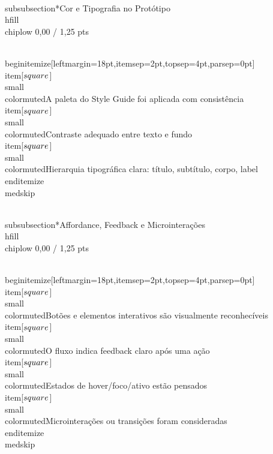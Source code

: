 \documentclass[11pt, a4paper]{article}
\newcommand{\chiplow}[1]{\colorbox{crimsondim}{\color{crimson}\semibold\small\strut\ #1\ }}
\begin{document}
\\subsubsection*{Cor e Tipografia no Protótipo \\hfill {\\chiplow 0,00 / 1,25 pts}}

\\begin{itemize}[leftmargin=18pt,itemsep=2pt,topsep=4pt,parsep=0pt]
  \\item[$\\square$] {\\small\\color{muted}A paleta do Style Guide foi aplicada com consistência}
  \\item[$\\square$] {\\small\\color{muted}Contraste adequado entre texto e fundo}
  \\item[$\\square$] {\\small\\color{muted}Hierarquia tipográfica clara: título, subtítulo, corpo, label}
\\end{itemize}
\\medskip

\\subsubsection*{Affordance, Feedback e Microinterações \\hfill {\\chiplow 0,00 / 1,25 pts}}

\\begin{itemize}[leftmargin=18pt,itemsep=2pt,topsep=4pt,parsep=0pt]
  \\item[$\\square$] {\\small\\color{muted}Botões e elementos interativos são visualmente reconhecíveis}
  \\item[$\\square$] {\\small\\color{muted}O fluxo indica feedback claro após uma ação}
  \\item[$\\square$] {\\small\\color{muted}Estados de hover/foco/ativo estão pensados}
  \\item[$\\square$] {\\small\\color{muted}Microinterações ou transições foram consideradas}
\\end{itemize}
\\medskip
\end{document}
